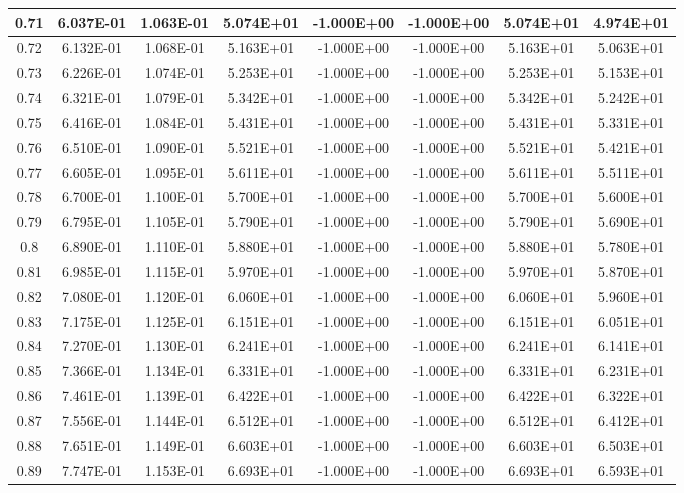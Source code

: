 \documentclass{article}
\begin{document}
\begin{center}
\begin{longtable}{|c|c|c|c|c|c|c|c|}
0.71 & 6.037E-01 & 1.063E-01 & 5.074E+01 & -1.000E+00 & -1.000E+00 & 5.074E+01 & 4.974E+01 \\ \hline
0.72 & 6.132E-01 & 1.068E-01 & 5.163E+01 & -1.000E+00 & -1.000E+00 & 5.163E+01 & 5.063E+01 \\ \hline
0.73 & 6.226E-01 & 1.074E-01 & 5.253E+01 & -1.000E+00 & -1.000E+00 & 5.253E+01 & 5.153E+01 \\ \hline
0.74 & 6.321E-01 & 1.079E-01 & 5.342E+01 & -1.000E+00 & -1.000E+00 & 5.342E+01 & 5.242E+01 \\ \hline
0.75 & 6.416E-01 & 1.084E-01 & 5.431E+01 & -1.000E+00 & -1.000E+00 & 5.431E+01 & 5.331E+01 \\ \hline
0.76 & 6.510E-01 & 1.090E-01 & 5.521E+01 & -1.000E+00 & -1.000E+00 & 5.521E+01 & 5.421E+01 \\ \hline
0.77 & 6.605E-01 & 1.095E-01 & 5.611E+01 & -1.000E+00 & -1.000E+00 & 5.611E+01 & 5.511E+01 \\ \hline
0.78 & 6.700E-01 & 1.100E-01 & 5.700E+01 & -1.000E+00 & -1.000E+00 & 5.700E+01 & 5.600E+01 \\ \hline
0.79 & 6.795E-01 & 1.105E-01 & 5.790E+01 & -1.000E+00 & -1.000E+00 & 5.790E+01 & 5.690E+01 \\ \hline
0.8 & 6.890E-01 & 1.110E-01 & 5.880E+01 & -1.000E+00 & -1.000E+00 & 5.880E+01 & 5.780E+01 \\ \hline
0.81 & 6.985E-01 & 1.115E-01 & 5.970E+01 & -1.000E+00 & -1.000E+00 & 5.970E+01 & 5.870E+01 \\ \hline
0.82 & 7.080E-01 & 1.120E-01 & 6.060E+01 & -1.000E+00 & -1.000E+00 & 6.060E+01 & 5.960E+01 \\ \hline
0.83 & 7.175E-01 & 1.125E-01 & 6.151E+01 & -1.000E+00 & -1.000E+00 & 6.151E+01 & 6.051E+01 \\ \hline
0.84 & 7.270E-01 & 1.130E-01 & 6.241E+01 & -1.000E+00 & -1.000E+00 & 6.241E+01 & 6.141E+01 \\ \hline
0.85 & 7.366E-01 & 1.134E-01 & 6.331E+01 & -1.000E+00 & -1.000E+00 & 6.331E+01 & 6.231E+01 \\ \hline
0.86 & 7.461E-01 & 1.139E-01 & 6.422E+01 & -1.000E+00 & -1.000E+00 & 6.422E+01 & 6.322E+01 \\ \hline
0.87 & 7.556E-01 & 1.144E-01 & 6.512E+01 & -1.000E+00 & -1.000E+00 & 6.512E+01 & 6.412E+01 \\ \hline
0.88 & 7.651E-01 & 1.149E-01 & 6.603E+01 & -1.000E+00 & -1.000E+00 & 6.603E+01 & 6.503E+01 \\ \hline
0.89 & 7.747E-01 & 1.153E-01 & 6.693E+01 & -1.000E+00 & -1.000E+00 & 6.693E+01 & 6.593E+01 \\ \hline

\end{longtable}
\end{center}
\end{document}
